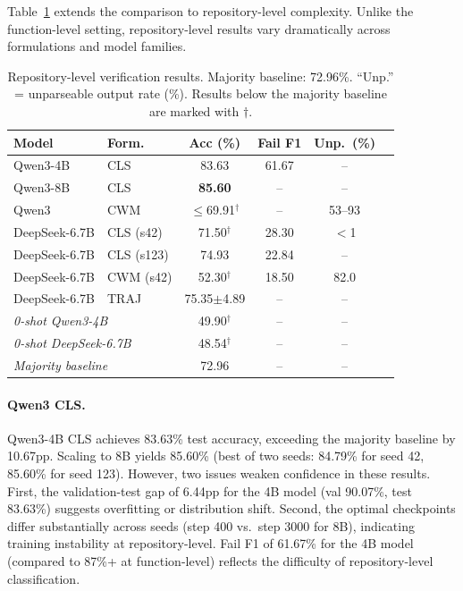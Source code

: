 \documentclass[11pt,a4paper]{article}
\begin{document}
Table~\ref{tab:repo} extends the comparison to repository-level complexity. Unlike the function-level setting, repository-level results vary dramatically across formulations and model families.

\begin{table}[t]
\centering
\caption{Repository-level verification results. Majority baseline: 72.96\%. ``Unp.'' = unparseable output rate (\%). Results below the majority baseline are marked with $\dagger$.}
\label{tab:repo}
\small
\begin{tabular}{llcccc}
\toprule
Model & Form. & Acc (\%) & Fail F1 & Unp.\ (\%) \\
\midrule
Qwen3-4B & CLS & 83.63 & 61.67 & -- \\
Qwen3-8B & CLS & \textbf{85.60} & -- & -- \\
Qwen3 & CWM & $\leq$69.91$^\dagger$ & -- & 53--93 \\
\midrule
DeepSeek-6.7B & CLS (s42) & 71.50$^\dagger$ & 28.30 & $<$1 \\
DeepSeek-6.7B & CLS (s123) & 74.93 & 22.84 & -- \\
DeepSeek-6.7B & CWM (s42) & 52.30$^\dagger$ & 18.50 & 82.0 \\
DeepSeek-6.7B & TRAJ & 75.35{\scriptsize$\pm$4.89} & -- & -- \\
\midrule
\multicolumn{2}{l}{\textit{0-shot Qwen3-4B}} & 49.90$^\dagger$ & -- & -- \\
\multicolumn{2}{l}{\textit{0-shot DeepSeek-6.7B}} & 48.54$^\dagger$ & -- & -- \\
\multicolumn{2}{l}{\textit{Majority baseline}} & 72.96 & -- & -- \\
\bottomrule
\end{tabular}
\end{table}

\paragraph{Qwen3 CLS.}
Qwen3-4B CLS achieves 83.63\% test accuracy, exceeding the majority baseline by 10.67pp. Scaling to 8B yields 85.60\% (best of two seeds: 84.79\% for seed 42, 85.60\% for seed 123). However, two issues weaken confidence in these results. First, the validation-test gap of 6.44pp for the 4B model (val 90.07\%, test 83.63\%) suggests overfitting or distribution shift. Second, the optimal checkpoints differ substantially across seeds (step 400 vs.\ step 3000 for 8B), indicating training instability at repository-level. Fail F1 of 61.67\% for the 4B model (compared to 87\%+ at function-level) reflects the difficulty of repository-level classification.
\end{document}
